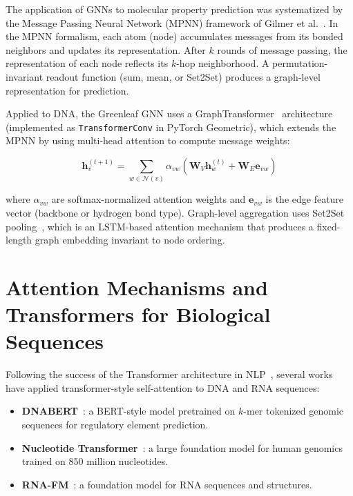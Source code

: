 \documentclass[12pt,oneside,letterpaper]{report}
\begin{document}
The application of GNNs to molecular property prediction was systematized by the Message Passing Neural Network (MPNN) framework of Gilmer et al.~\cite{gilmer2017}. In the MPNN formalism, each atom (node) accumulates messages from its bonded neighbors and updates its representation. After $k$ rounds of message passing, the representation of each node reflects its $k$-hop neighborhood. A permutation-invariant readout function (sum, mean, or Set2Set) produces a graph-level representation for prediction.

Applied to DNA, the Greenleaf GNN uses a GraphTransformer~\cite{shi2021} architecture (implemented as \texttt{TransformerConv} in PyTorch Geometric), which extends the MPNN by using multi-head attention to compute message weights:

\begin{equation}
    \mathbf{h}_v^{(t+1)} = \sum_{w \in \mathcal{N}(v)} \alpha_{vw} \left( \mathbf{W}_V \mathbf{h}_w^{(t)} + \mathbf{W}_E \mathbf{e}_{vw} \right)
    \label{eq:graphtransformer}
\end{equation}

where $\alpha_{vw}$ are softmax-normalized attention weights and $\mathbf{e}_{vw}$ is the edge feature vector (backbone or hydrogen bond type). Graph-level aggregation uses Set2Set pooling~\cite{vinyals2016}, which is an LSTM-based attention mechanism that produces a fixed-length graph embedding invariant to node ordering.

\section{Attention Mechanisms and Transformers for Biological Sequences}

Following the success of the Transformer architecture in NLP~\cite{vaswani2017}, several works have applied transformer-style self-attention to DNA and RNA sequences:

\begin{itemize}
    \item \textbf{DNABERT}~\cite{dnabert2021}: a BERT-style model pretrained on $k$-mer tokenized genomic sequences for regulatory element prediction.
    \item \textbf{Nucleotide Transformer}~\cite{nucleotidetransformer2023}: a large foundation model for human genomics trained on 850 million nucleotides.
    \item \textbf{RNA-FM}~\cite{rnaFM2022}: a foundation model for RNA sequences and structures.
\end{itemize}
\end{document}
